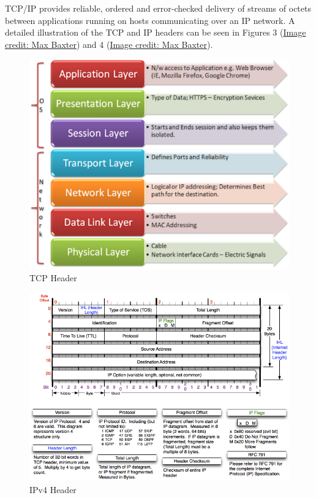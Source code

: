 \documentclass[12pt,]{article}
\begin{document}
TCP/IP provides reliable, ordered and error-checked delivery of streams
of octets between applications running on hosts communicating over an IP
network. A detailed illustration of the TCP and IP headers can be seen
in Figures 3
(\href{http://nmap.org/book/images/hdr/MJB-TCP-Header}{Image credit: Max
Baxter}) and 4
(\href{http://nmap.org/book/images/hdr/MJB-IP-Header}{Image credit: Max
Baxter}).

\begin{figure}

{\centering \includegraphics{test2_files/figure-latex/unnamed-chunk-4-1} 

}

\caption{TCP Header}\label{fig:unnamed-chunk-4}
\end{figure}

\begin{figure}

{\centering \includegraphics{test2_files/figure-latex/unnamed-chunk-5-1} 

}

\caption{IPv4 Header}\label{fig:unnamed-chunk-5}
\end{figure}
\end{document}
